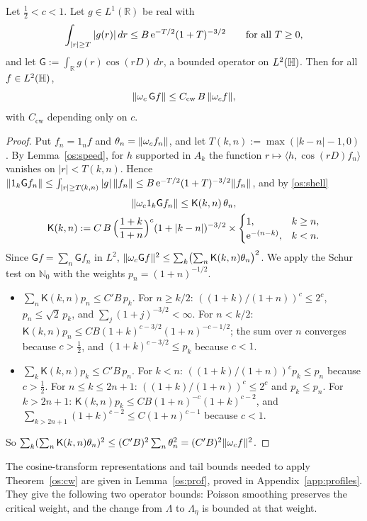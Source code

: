 \begin{theorem}\label{os:cw}
Let $\tfrac12<c<1$. Let $g\in L^1(\mathbb R)$ be real with
\[
\int_{|r|\ge T}|g(r)|\,dr\le B\,\mathrm{e}^{-T/2}(1+T)^{-3/2}\qquad\text{for all }T\ge0,
\]
and let $\mathsf G:=\int_{\mathbb R}g(r)\cos(rD)\,dr$, a bounded operator on $L^2(\mathbb{H})$. Then for all $f\in L^2(\mathbb{H})$,
\[
\lVert \omega_c\,\mathsf Gf\rVert\le C_{\mathrm{cw}}\,B\,\lVert \omega_c f\rVert,
\]
with $C_{\mathrm{cw}}$ depending only on $c$.
\end{theorem}
\begin{proof}
Put $f_n=1_nf$ and $\theta_n=\lVert \omega_c f_n\rVert$, and let $T(k,n):=\max(|k-n|-1,0)$. By Lemma~\ref{os:speed}, for $h$ supported in $A_k$ the function
$r\mapsto\langle h,\cos(rD)f_n\rangle$ vanishes on $|r|<T(k,n)$. Hence
$\lVert 1_k\mathsf Gf_n\rVert\le\int_{|r|\ge T(k,n)}|g|\,\lVert f_n\rVert\le B\,\mathrm{e}^{-T/2}(1+T)^{-3/2}\lVert f_n\rVert$, and by \eqref{os:shell}
\[
\begin{gathered}
\lVert \omega_c1_k\mathsf Gf_n\rVert\le\mathsf K(k,n)\,\theta_n,\\
\mathsf K(k,n):=C\,B\,\Bigl(\frac{1+k}{1+n}\Bigr)^c(1+|k-n|)^{-3/2}\times
\begin{cases}1,&k\ge n,\\ \mathrm{e}^{-(n-k)},&k<n.\end{cases}
\end{gathered}
\]
Since $\mathsf Gf=\sum_n\mathsf Gf_n$ in $L^2$, $\lVert \omega_c\mathsf Gf\rVert^2\le\sum_k\bigl(\sum_n\mathsf K(k,n)\theta_n\bigr)^2$. We apply the Schur test on
$\mathbb N_0$ with the weights $p_n=(1+n)^{-1/2}$.
\begin{itemize}
\item $\sum_n\mathsf K(k,n)p_n\le C'B\,p_k$. For $n\ge k/2$: $((1+k)/(1+n))^c\le2^c$, $p_n\le\sqrt2\,p_k$, and $\sum_j(1+j)^{-3/2}<\infty$. For $n<k/2$:
$\mathsf K(k,n)p_n\le CB(1+k)^{c-3/2}(1+n)^{-c-1/2}$; the sum over $n$ converges because $c>\tfrac12$, and $(1+k)^{c-3/2}\le p_k$ because $c<1$.
\item $\sum_k\mathsf K(k,n)p_k\le C'B\,p_n$. For $k<n$: $((1+k)/(1+n))^cp_k\le p_n$ because $c>\tfrac12$. For $n\le k\le2n+1$: $((1+k)/(1+n))^c\le2^c$ and
$p_k\le p_n$. For $k>2n+1$: $\mathsf K(k,n)p_k\le CB(1+n)^{-c}(1+k)^{c-2}$, and $\sum_{k>2n+1}(1+k)^{c-2}\le C(1+n)^{c-1}$ because $c<1$.
\end{itemize}
So $\sum_k(\sum_n\mathsf K(k,n)\theta_n)^2\le(C'B)^2\sum_n\theta_n^2=(C'B)^2\lVert \omega_c f\rVert^2$.
\end{proof}

The cosine-transform representations and tail bounds needed to apply Theorem~\ref{os:cw}
are given in Lemma~\ref{os:prof}, proved in Appendix~\ref{app:profiles}.
They give the following two operator bounds: Poisson smoothing preserves the critical weight,
and the change from $\Lambda$ to $\Lambda_\eta$ is bounded at that weight.

